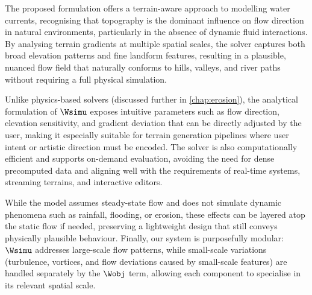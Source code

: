The proposed formulation offers a terrain-aware approach to modelling water currents, recognising that topography is the dominant influence on flow direction in natural environments, particularly in the absence of dynamic fluid interactions. By analysing terrain gradients at multiple spatial scales, the solver captures both broad elevation patterns and fine landform features, resulting in a plausible, nuanced flow field that naturally conforms to hills, valleys, and river paths without requiring a full physical simulation.

Unlike physics-based solvers (discussed further in \cref{chap:erosion}), the analytical formulation of $\Wsimu$ exposes intuitive parameters such as flow direction, elevation sensitivity, and gradient deviation that can be directly adjusted by the user, making it especially suitable for terrain generation pipelines where user intent or artistic direction must be encoded. The solver is also computationally efficient and supports on-demand evaluation, avoiding the need for dense precomputed data and aligning well with the requirements of real-time systems, streaming terrains, and interactive editors.

While the model assumes steady-state flow and does not simulate dynamic phenomena such as rainfall, flooding, or erosion, these effects can be layered atop the static flow if needed, preserving a lightweight design that still conveys physically plausible behaviour. Finally, our system is purposefully modular: $\Wsimu$ addresses large-scale flow patterns, while small-scale variations (turbulence, vortices, and flow deviations caused by small-scale features) are handled separately by the $\Wobj$ term, allowing each component to specialise in its relevant spatial scale.



